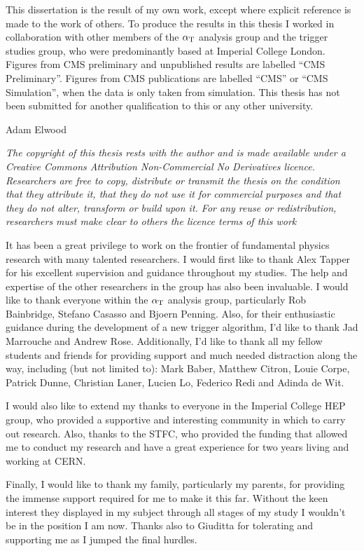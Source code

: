\begin{declaration}
  This dissertation is the result of my own work, except where
  explicit reference is made to the work of others. To produce the
  results in this thesis I worked in collaboration with other members of
  the $\alpha_{\text{T}}$ analysis group and the trigger studies group, who were
  predominantly based at Imperial College London. Figures from CMS
  preliminary and unpublished results are labelled ``CMS
  Preliminary''. Figures from CMS publications are labelled ``CMS'' or
  ``CMS Simulation'', when the data is only taken from simulation. This
  thesis has not been submitted for another qualification to this or
  any other university. 
  \vspace*{1cm}
  \begin{flushright}
    Adam Elwood
  \end{flushright}
  \vspace*{1cm}
  {\it The copyright of this thesis rests with the author and is made
  available under a Creative Commons Attribution Non-Commercial No
  Derivatives licence. Researchers are free to copy, distribute or
  transmit the thesis on the condition that they attribute it, that
  they do
  not use it for commercial purposes and that they do not alter,
  transform or build upon it. For any reuse or redistribution,
  researchers must make clear to others the licence terms of this
  work}
\end{declaration}


\begin{acknowledgements}
It has been a great privilege to work on the frontier of fundamental
physics research with many talented researchers. I would first like to
thank Alex Tapper for his excellent supervision and guidance
throughout my studies. The help and expertise of the
other researchers in the group has also been invaluable. I would like to
thank everyone within the $\alpha_{\text{T}}$ analysis group, particularly Rob
Bainbridge, Stefano Casasso and Bjoern Penning. Also, for their enthusiastic
guidance during the development of a new trigger algorithm, I'd like to
thank Jad Marrouche and Andrew Rose. Additionally, I'd like to thank
all my fellow students and friends for providing support and much
needed distraction along the way, including (but not limited to): Mark
Baber, Matthew Citron, Louie Corpe, Patrick Dunne, Christian Laner,
Lucien Lo, Federico Redi and Adinda de Wit.

I would also like to extend my thanks to everyone in the Imperial
College HEP group, who provided a supportive and interesting community
in which to carry out research. Also, thanks to the STFC,
who provided the funding that allowed me to conduct my research and
have a great experience for two years living and working at CERN.

Finally, I would like to thank my family, particularly my parents, for
providing the immense support required for me to make it this far.
Without the keen interest they displayed in my subject through all
stages of my study I wouldn't be in the position I am now. Thanks
also to Giuditta for tolerating and supporting me as I jumped the
final hurdles.
\end{acknowledgements}


